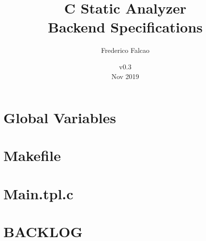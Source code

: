 \documentclass[12pt]{article}
\begin{document}
\title{C Static Analyzer\\ Backend Specifications}
\author{Frederico Falcao}
\date{v0.3 \\ Nov 2019}
\maketitle
\begin{center}
\end{center}

\newpage
\section*{Global Variables}


\newpage
\section*{Makefile}


\newpage
\section*{Main.tpl.c}


\newpage
\section{BACKLOG}



\newpage
\newpage
\end{document}
